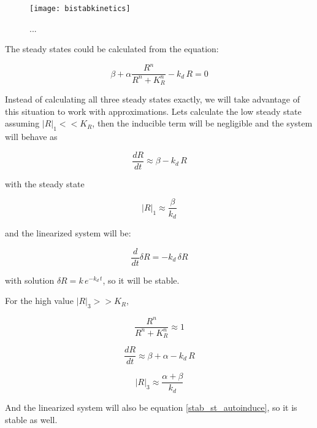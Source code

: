 \begin{figure}
	\begin{center}
		\texttt{[image: bistabkinetics]}
	\end{center}
	\caption{ ... }
	\label{fig:bistabkin}
\end{figure}

The steady states could be calculated from the equation:

\begin{equation}
	 \beta + \alpha \frac{R^n}{R^n  + K_R^n} - k_d \, R = 0
\end{equation}

Instead of calculating all three steady states exactly, we will take advantage of this situation to work with approximations. Lets calculate the low steady state assuming $| R |_1 << K_R$, then the inducible term will be negligible and the system will behave as

\begin{equation}
	\frac{dR}{dt} \approx \beta - k_d \, R
\end{equation}

with the steady state

\begin{equation}
	|R|_1 \approx \frac{\beta}{k_d }
\end{equation}

and the linearized system will be:

\begin{equation}
	\frac{d}{dt} \delta R =  - k_d \, \delta R
\end{equation}

with solution $\delta R = k \, e^{- k_d\, t}$, so it will be stable.

For the high value $| R |_3 >> K_R$,


\begin{equation}
	\frac{R^n}{R^n  + K_R^n}  \approx 1
\end{equation}

\begin{equation}
	\frac{dR}{dt} \approx \beta + \alpha - k_d \, R
	\label{stab_st_autoinduce}
\end{equation}


\begin{equation}
	|R|_3 \approx \frac{\alpha + \beta}{k_d }
\end{equation}

And the linearized system will also be equation  \ref{stab_st_autoinduce}, so it is stable as well.

